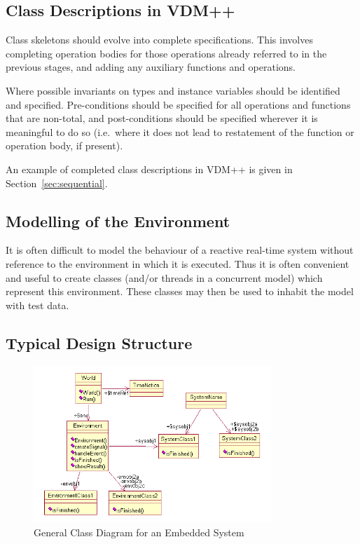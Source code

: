 \documentclass{overturerepchap}
\begin{document}
\subsection{Class Descriptions in VDM++}

Class skeletons should evolve into complete specifications. This
involves completing operation bodies for those operations already
referred to in the previous stages, and adding any auxiliary functions
and operations.

Where possible invariants on types and instance variables should be
identified and specified. Pre-conditions should be specified for all
operations and functions that are non-total, and post-conditions
should be specified wherever it is meaningful to do so (i.e.\ where it
does not lead to restatement of the function or operation body, if
present).

An example of completed class descriptions in VDM++ is given in
Section~\ref{sec:sequential}.

\subsection{Modelling of the Environment}

It is often difficult to model the behaviour of a reactive real-time
system without reference to the environment in which it is
executed. Thus it is often convenient and useful to create classes
(and/or threads in a concurrent model) which represent this
environment. These classes may then be used to inhabit the model with
test data.

\subsection{Typical Design Structure}\label{sec:typicalclassdiag}

\begin{figure}
\begin{center}
\includegraphics[width=0.8\textwidth]{figures/generalclassdiag.png}
\end{center}
\caption{General Class Diagram for an Embedded System}\label{fig:classdiag}
\end{figure}
\end{document}

